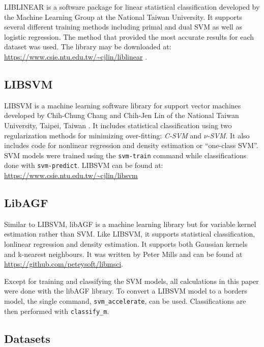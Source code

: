 LIBLINEAR is a software package for linear statistical classification 
developed by the Machine Learning Group at the National Taiwan University.
It supports several different training methods including primal and dual
SVM as well as logistic regression.
The method that provided the most accurate results for each dataset was used.
The library may be downloaded at: 
\url{https://www.csie.ntu.edu.tw/~cjlin/liblinear} \citep{Fan_etal2008}.


\subsection{LIBSVM}

LIBSVM is a machine learning software library for support vector machines 
developed by Chih-Chung Chang and Chih-Jen Lin of 
the National Taiwan University, Taipei, Taiwan \citep{Chang_Lin2011}.
It includes statistical classification using two regularization methods 
for minimizing over-fitting: 
{\it C-SVM} and {\it $\nu$-SVM}.
It also includes code for nonlinear regression and density estimation or
``one-class SVM''.
SVM models were trained using the \verb/svm-train/ command while
classifications done with \verb/svm-predict/.
LIBSVM can be found at: \url{https://www.csie.ntu.edu.tw/~cjlin/libsvm}

\subsection{LibAGF}

Similar to LIBSVM, libAGF is a machine learning library but for variable kernel 
estimation \citep{Mills2011,Terrell_Scott1992} rather than SVM.
Like LIBSVM, it supports statistical classification, lonlinear regression
and density estimation.
It supports both Gaussian kernels and k-nearest neighbours.
It was written by Peter Mills and can be found at
\url{https://github.com/peteysoft/libmsci}.

Except for training and classifying the SVM models, all calculations in this paper were done 
with the libAGF library. To convert a LIBSVM model to a borders model,
the single command, \verb/svm_accelerate/, can be used.
Classifications are then performed with \verb/classify_m/.

\subsection{Datasets}

\label{datasets}

